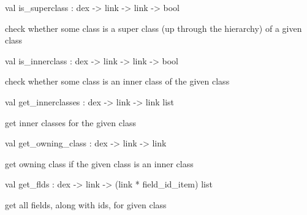 \documentclass[11pt]{article}
\begin{document}
\label{val:Dex.is-underscoresuperclass}\begin{ocamldoccode}
val is_superclass : dex -> link -> link -> bool
\end{ocamldoccode}
\begin{ocamldocdescription}
check whether some class is a super class (up through the hierarchy) 
    of a given class


\end{ocamldocdescription}




\label{val:Dex.is-underscoreinnerclass}\begin{ocamldoccode}
val is_innerclass : dex -> link -> link -> bool
\end{ocamldoccode}
\begin{ocamldocdescription}
check whether some class is an inner class of the given class


\end{ocamldocdescription}




\label{val:Dex.get-underscoreinnerclasses}\begin{ocamldoccode}
val get_innerclasses : dex -> link -> link list
\end{ocamldoccode}
\begin{ocamldocdescription}
get inner classes for the given class


\end{ocamldocdescription}




\label{val:Dex.get-underscoreowning-underscoreclass}\begin{ocamldoccode}
val get_owning_class : dex -> link -> link
\end{ocamldoccode}
\begin{ocamldocdescription}
get owning class if the given class is an inner class


\end{ocamldocdescription}




\label{val:Dex.get-underscoreflds}\begin{ocamldoccode}
val get_flds : dex -> link -> (link * field_id_item) list
\end{ocamldoccode}
\begin{ocamldocdescription}
get all fields, along with ids, for given class


\end{ocamldocdescription}
\end{document}
